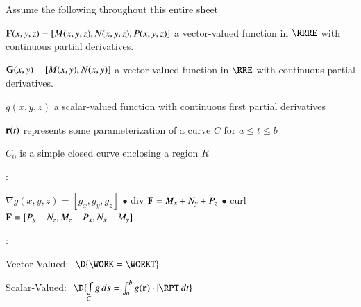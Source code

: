 \documentclass[11pt]{article}
\renewenvironment{itemize}{
  \begin{list}{}{
    \setlength{\leftmargin}{1em}
  }
}{
  \end{list}
}
\begin{document}

Assume the following throughout this entire sheet 
\begin{itemize}
	\item[$\bullet$] ${\bf F}(x,y,z) = [M(x,y,z),N(x,y,z),P(x,y,z)] $ a vector-valued function in $\RRRE$ with continuous partial derivatives.
	\item[$\bullet$] ${\bf G}(x,y) = [M(x,y),N(x,y)] $ a vector-valued function in $\RRE$ with continuous partial derivatives.
	\item[$\bullet$] $g(x,y,z)$ a scalar-valued function with continuous first partial derivatives
	\item[$\bullet$] ${\bf r}(t)$ represents some parameterization of a curve $C$ for $a \le t \le b$
	\item[$\bullet$] $C_0$ is a simple closed curve enclosing a region $R$
\end{itemize}

\vspace{0.2cm}

:
\begin{itemize}
	\item[$\bullet$] $\nabla g(x,y,z) = [g_x,g_y,g_z]$ \hspace{2.0cm} $\bullet$ div ${\bf F} = M_x + N_y + P_z$ \hspace{2.0cm} $\bullet$ curl ${\bf F} = [P_y-N_z,M_z-P_x,N_x-M_y]$
\end{itemize}

\vspace{0.2cm}

:
\begin{itemize}
	\item[$\bullet$] Vector-Valued: \,\,$\D{\WORK = \WORKT}$
	\item[$\bullet$] Scalar-Valued: \,\,$\D{\int \limits_{C} g \, ds = \int_{a}^{b} g({\bf r}) \cdot |\RPT| dt}$
\end{itemize}

\vspace{0.2cm}

\end{document}
